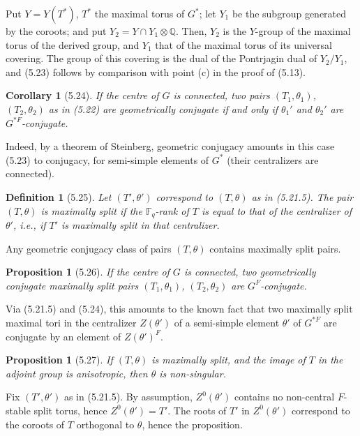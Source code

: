 \documentclass[11pt]{amsart}
\theoremstyle{plain}
\newtheorem{proposition}[theorem]{Proposition}
\newtheorem{corollary}[theorem]{Corollary}
\newtheorem{definition}[theorem]{Definition}
\theoremstyle{remark}
\begin{document}
Put $Y = Y(T^*)$, $T^*$ the maximal torus of $G^*$; let $Y_1$ be the subgroup generated by the coroots; and put $Y_2 = Y \cap Y_1 \otimes \mathbb{Q}$. Then, $Y_2$ is the $Y$-group of the maximal torus of the derived group, and $Y_1$ that of the maximal torus of its universal covering. The group of this covering is the dual of the Pontrjagin dual of $Y_2/Y_1$, and (5.23) follows by comparison with point (c) in the proof of (5.13).

\begin{corollary}[5.24]
If the centre of $G$ is connected, two pairs $(T_1, \theta_1)$, $(T_2, \theta_2)$ as in (5.22) are geometrically conjugate if and only if $\theta_1'$ and $\theta_2'$ are $G^{*F}$-conjugate.
\end{corollary}

Indeed, by a theorem of Steinberg, geometric conjugacy amounts in this case (5.23) to conjugacy, for semi-simple elements of $G^*$ (their centralizers are connected).

\begin{definition}[5.25]
Let $(T', \theta')$ correspond to $(T, \theta)$ as in (5.21.5). The pair $(T, \theta)$ is \textit{maximally split} if the $\mathbb{F}_q$-rank of $T$ is equal to that of the centralizer of $\theta'$, i.e., if $T'$ is maximally split in that centralizer.
\end{definition}

Any geometric conjugacy class of pairs $(T, \theta)$ contains maximally split pairs.

\begin{proposition}[5.26]
If the centre of $G$ is connected, two geometrically conjugate maximally split pairs $(T_1, \theta_1)$, $(T_2, \theta_2)$ are $G^F$-conjugate.
\end{proposition}

Via (5.21.5) and (5.24), this amounts to the known fact that two maximally split maximal tori in the centralizer $Z(\theta')$ of a semi-simple element $\theta'$ of $G^{*F}$ are conjugate by an element of $Z(\theta')^F$.

\begin{proposition}[5.27]
If $(T, \theta)$ is maximally split, and the image of $T$ in the adjoint group is anisotropic, then $\theta$ is non-singular.
\end{proposition}

Fix $(T', \theta')$ as in (5.21.5). By assumption, $Z^0(\theta')$ contains no non-central $F$-stable split torus, hence $Z^0(\theta') = T'$. The roots of $T'$ in $Z^0(\theta')$ correspond to the coroots of $T$ orthogonal to $\theta$, hence the proposition.
\end{document}
